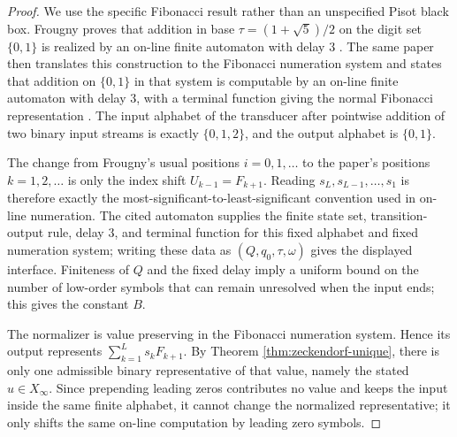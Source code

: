 \begin{proof}
We use the specific Fibonacci result rather than an unspecified Pisot black box. Frougny proves that addition in base \(\tau=(1+\sqrt5)/2\) on the digit set \(\{0,1\}\) is realized by an on-line finite automaton with delay \(3\) \cite[Proposition~13]{Frougny1999OnlineAddition}. The same paper then translates this construction to the Fibonacci numeration system and states that addition on \(\{0,1\}\) in that system is computable by an on-line finite automaton with delay \(3\), with a terminal function giving the normal Fibonacci representation \cite[Corollary~4]{Frougny1999OnlineAddition}. The input alphabet of the transducer after pointwise addition of two binary input streams is exactly \(\{0,1,2\}\), and the output alphabet is \(\{0,1\}\).

The change from Frougny's usual positions \(i=0,1,\dots\) to the paper's positions \(k=1,2,\dots\) is only the index shift \(U_{k-1}=F_{k+1}\). Reading \(s_L,s_{L-1},\dots,s_1\) is therefore exactly the most-significant-to-least-significant convention used in on-line numeration. The cited automaton supplies the finite state set, transition-output rule, delay \(3\), and terminal function for this fixed alphabet and fixed numeration system; writing these data as \((Q,q_0,\tau,\omega)\) gives the displayed interface. Finiteness of \(Q\) and the fixed delay imply a uniform bound on the number of low-order symbols that can remain unresolved when the input ends; this gives the constant \(B\).

The normalizer is value preserving in the Fibonacci numeration system. Hence its output represents \(\sum_{k=1}^{L}s_kF_{k+1}\). By Theorem \ref{thm:zeckendorf-unique}, there is only one admissible binary representative of that value, namely the stated \(u\in X_\infty\). Since prepending leading zeros contributes no value and keeps the input inside the same finite alphabet, it cannot change the normalized representative; it only shifts the same on-line computation by leading zero symbols.
\end{proof}

